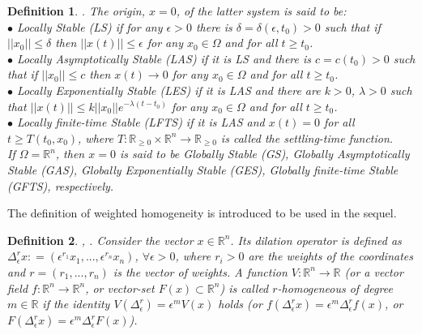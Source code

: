 \documentclass[journal,twoside,web]{ieeecolor}
\newcommand{\norm}[1]{\left|\left| #1 \right|\right|}
\newtheorem{definition}{Definition}
\begin{document}
\begin{definition}
\label{def:stability}
\cite{b:Khalil2002,b:Bhat-Bernstein}.
The origin, $x = 0$, of the latter system is said to be:\\
$\bullet$ Locally Stable (LS) if for any $\epsilon >0$ there is $\delta=\delta(\epsilon,t_0)>0$ such that if $\norm{{ x }_{ 0 }} \le \delta$ then $\norm{x(t)} \le \epsilon$ for any ${x}_{0} \in \Omega$ and for all $t\ge { t }_{ 0 }$.\\
$\bullet$ Locally Asymptotically Stable (LAS) if it is LS and there is $c=c(t_0) > 0$ such that if $\norm{{ x }_{ 0 }} \le c$ then $x(t) \rightarrow 0$ for any ${x}_{0} \in \Omega$ and for all $t\ge { t }_{ 0 }$.\\
$\bullet$ Locally Exponentially Stable (LES) if it is LAS and there are $k>0$, $\lambda>0$ such that $\norm{x(t)} \leq k\norm{x_0}e^{-\lambda(t-t_0)}$ for any ${x}_{0} \in \Omega$ and for all $t\ge { t }_{ 0 }$.\\
$\bullet$ Locally finite-time Stable (LFTS) if it is LAS and $x(t)=0$ for all $t\ge T(t_0,{ x }_{ 0 } )$, where $T:\mathbb{R}_{\geq 0} \times \mathbb{R}^n \to \mathbb{R}_{\geq 0}$ is called the settling-time function.\\
If $\Omega={\mathbb{R}}^{n}$, then $x = 0$ is said to be Globally Stable (GS), Globally Asymptotically Stable (GAS), Globally Exponentially Stable (GES), Globally finite-time Stable (GFTS), respectively.
\end{definition}

The definition of weighted homogeneity is introduced to be used in the sequel.
\begin{definition} \cite{b:Baccioti-Rosier_2005}, \cite{b:Bernuau-Efimov-Perruquetti-Polyakov}. 
Consider the vector $x \in \mathbb{R}^n$. Its dilation operator is defined as $\Delta_\epsilon^{r}x: = (\epsilon^{r_1} x_1, ..., \epsilon^{r_n} x_n)$, $\forall \epsilon > 0$, where $r_i > 0$ are the weights of the coordinates and $r = (r_1, ..., r_n)$ is the vector of weights. A function $V: \mathbb{R}^n \rightarrow \mathbb{R}$ (or a vector field $f: \mathbb{R}^n \rightarrow \mathbb{R}^n$, or vector-set $F(x) \subset \mathbb{R}^n$) is called $r$-homogeneous of degree $m \in \mathbb{R}$ if the identity $V(\Delta_\epsilon^{r}) = \epsilon^{m}V(x)$ holds (or $f(\Delta_\epsilon^{r} x) = \epsilon^{m} \Delta_\epsilon^{r} f(x)$, or $F(\Delta_\epsilon^{r} x) = \epsilon^{m} \Delta_\epsilon^{r} F(x)$). %
\end{definition}
\end{document}
